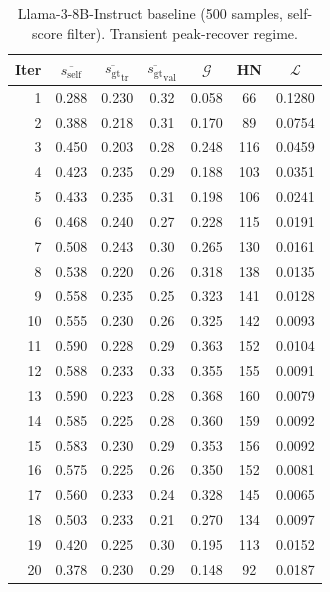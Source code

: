 \documentclass{article}
\newcommand{\gap}{\mathcal{G}}          %
\newcommand{\self}{s_{\text{self}}}     %
\newcommand{\gt}{s_{\text{gt}}}         %
\begin{document}
\begin{table}[h]
\centering
\caption{Llama-3-8B-Instruct baseline (500 samples, self-score filter). Transient peak-recover regime.}
\label{tab:app-llama3}
\small
\begin{tabular}{rcccccc}
\toprule
Iter & $\overline{\self}$ & $\overline{\gt}_\text{tr}$ & $\overline{\gt}_\text{val}$ & $\gap$ & HN & $\mathcal{L}$ \\
\midrule
1  & 0.288 & 0.230 & 0.32 & 0.058 & 66  & 0.1280 \\
2  & 0.388 & 0.218 & 0.31 & 0.170 & 89  & 0.0754 \\
3  & 0.450 & 0.203 & 0.28 & 0.248 & 116 & 0.0459 \\
4  & 0.423 & 0.235 & 0.29 & 0.188 & 103 & 0.0351 \\
5  & 0.433 & 0.235 & 0.31 & 0.198 & 106 & 0.0241 \\
6  & 0.468 & 0.240 & 0.27 & 0.228 & 115 & 0.0191 \\
7  & 0.508 & 0.243 & 0.30 & 0.265 & 130 & 0.0161 \\
8  & 0.538 & 0.220 & 0.26 & 0.318 & 138 & 0.0135 \\
9  & 0.558 & 0.235 & 0.25 & 0.323 & 141 & 0.0128 \\
10 & 0.555 & 0.230 & 0.26 & 0.325 & 142 & 0.0093 \\
11 & 0.590 & 0.228 & 0.29 & 0.363 & 152 & 0.0104 \\
12 & 0.588 & 0.233 & 0.33 & 0.355 & 155 & 0.0091 \\
13 & 0.590 & 0.223 & 0.28 & 0.368 & 160 & 0.0079 \\
14 & 0.585 & 0.225 & 0.28 & 0.360 & 159 & 0.0092 \\
15 & 0.583 & 0.230 & 0.29 & 0.353 & 156 & 0.0092 \\
16 & 0.575 & 0.225 & 0.26 & 0.350 & 152 & 0.0081 \\
17 & 0.560 & 0.233 & 0.24 & 0.328 & 145 & 0.0065 \\
18 & 0.503 & 0.233 & 0.21 & 0.270 & 134 & 0.0097 \\
19 & 0.420 & 0.225 & 0.30 & 0.195 & 113 & 0.0152 \\
20 & 0.378 & 0.230 & 0.29 & 0.148 & 92  & 0.0187 \\
\bottomrule
\end{tabular}
\end{table}
\end{document}
